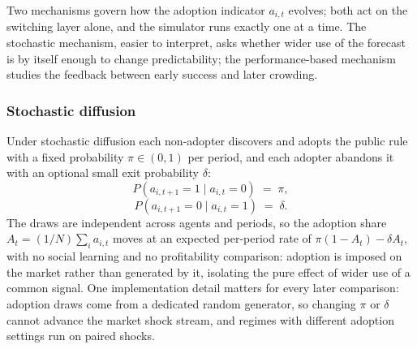 \documentclass[12pt]{article}
\begin{document}
Two mechanisms govern how the adoption indicator $a_{i,t}$ evolves; both act on the switching layer alone, and the simulator runs exactly one at a time. The stochastic mechanism, easier to interpret, asks whether wider use of the forecast is by itself enough to change predictability; the performance-based mechanism studies the feedback between early success and later crowding. %

\subsubsection{Stochastic diffusion}

Under stochastic diffusion each non-adopter discovers and adopts the public rule with a fixed probability $\pi \in (0, 1)$ per period, and each adopter abandons it with an optional small exit probability $\delta$: %
\begin{equation}
  P(a_{i,t+1} = 1 \mid a_{i,t} = 0) \;=\; \pi,
  \label{eq:diffusion-entry}
\end{equation}
\begin{equation}
  P(a_{i,t+1} = 0 \mid a_{i,t} = 1) \;=\; \delta.
  \label{eq:diffusion-exit}
\end{equation}
The draws are independent across agents and periods, so the adoption share $A_t = (1/N)\sum_i a_{i,t}$ moves at an expected per-period rate of $\pi(1 - A_t) - \delta A_t$, with no social learning and no profitability comparison: adoption is imposed on the market rather than generated by it, isolating the pure effect of wider use of a common signal. %
One implementation detail matters for every later comparison: adoption draws come from a dedicated random generator, so changing $\pi$ or $\delta$ cannot advance the market shock stream, and regimes with different adoption settings run on paired shocks. %
\end{document}
